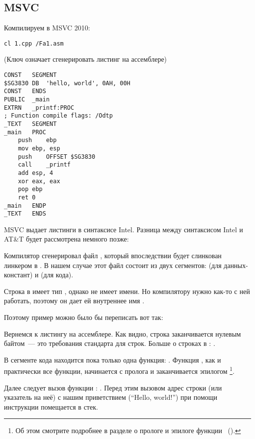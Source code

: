 \subsection{MSVC}

Компилируем в MSVC 2010:

\begin{lstlisting}
cl 1.cpp /Fa1.asm
\end{lstlisting}

(Ключ  означает сгенерировать листинг на ассемблере)

\begin{lstlisting}[caption=MSVC 2010]
CONST	SEGMENT
$SG3830	DB	'hello, world', 0AH, 00H
CONST	ENDS
PUBLIC	_main
EXTRN	_printf:PROC
; Function compile flags: /Odtp
_TEXT	SEGMENT
_main	PROC
	push	ebp
	mov	ebp, esp
	push	OFFSET $SG3830
	call	_printf
	add	esp, 4
	xor	eax, eax
	pop	ebp
	ret	0
_main	ENDP
_TEXT	ENDS
\end{lstlisting}

MSVC выдает листинги в синтаксисе Intel.
Разница между синтаксисом Intel и AT\&T будет рассмотрена немного позже:

Компилятор сгенерировал файл , который впоследствии будет слинкован линкером в .
В нашем случае этот файл состоит из двух сегментов:  (для данных-констант) и  (для кода).

\label{string_is_const_char}
Строка  в \CCpp имеет тип \cite[p176, 7.3.2]{TCPPPL}, однако не имеет имени.
Но компилятору нужно как-то с ней работать, поэтому он дает ей внутреннее имя .

Поэтому пример можно было бы переписать вот так:



Вернемся к листингу на ассемблере. Как видно, строка заканчивается нулевым байтом~--- это требования стандарта \CCpp для строк.
Больше о строках в \CCpp: .

В сегменте кода  находится пока только одна функция: \main{}.
Функция \main, как и практически все функции, начинается с пролога и заканчивается эпилогом
\footnote{Об этом смотрите подробнее в разделе о прологе и эпилоге функции ~().}.

Далее следует вызов функции \printf{}: .
Перед этим вызовом адрес строки (или указатель на неё) с нашим приветствием (``Hello, world!'') при помощи инструкции \PUSH помещается в стек.

